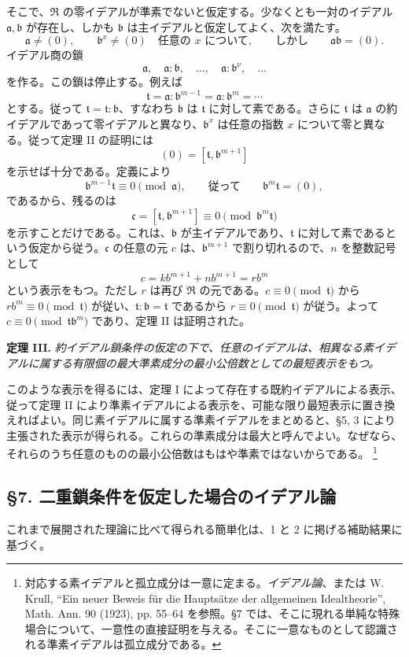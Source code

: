 \documentclass[11pt]{article}
\providecommand{\mR}{\mathfrak{R}}
\providecommand{\ma}{\mathfrak{a}}
\providecommand{\mb}{\mathfrak{b}}
\providecommand{\mc}{\mathfrak{c}}
\providecommand{\mt}{\mathfrak{t}}
\begin{document}
そこで、$\mR$ の零イデアルが準素でないと仮定する。少なくとも一対のイデアル $\ma,\mb$ が存在し、しかも $\mb$ は主イデアルと仮定してよく、次を満たす。
\[
\ma\ne(0),\qquad \mb^x\ne(0)\quad\text{任意の }x\text{ について},
\qquad\text{しかし}\qquad \ma\mb=(0).
\]
イデアル商の鎖
\[
\ma,\quad \ma:\mb,\quad \ldots,\quad \ma:\mb^\nu,\quad\ldots
\]
を作る。この鎖は停止する。例えば
\[
\mt=\ma:\mb^{m-1}=\ma:\mb^m=\cdots
\]
とする。従って $\mt=\mt:\mb$、すなわち $\mb$ は $\mt$ に対して素である。さらに $\mt$ は $\ma$ の約イデアルであって零イデアルと異なり、$\mb^x$ は任意の指数 $x$ について零と異なる。従って定理 II の証明には
\[
        (0)=[\mt,\mb^{m+1}]
\]
を示せば十分である。定義により
\[
        \mb^{m-1}\mt\equiv0\pmod{\ma},\qquad\text{従って}\qquad \mb^m\mt=(0),
\]
であるから、残るのは
\[
        \mc=[\mt,\mb^{m+1}]\equiv0\pmod{\mb^m\mt}
\]
を示すことだけである。これは、$\mb$ が主イデアルであり、$\mt$ に対して素であるという仮定から従う。$\mc$ の任意の元 $c$ は、$\mb^{m+1}$ で割り切れるので、$n$ を整数記号として
\[
        c=k b^{m+1}+n b^{m+1}=r b^m
\]
という表示をもつ。ただし $r$ は再び $\mR$ の元である。$c\equiv0\pmod{\mt}$ から $r b^m\equiv0\pmod{\mt}$ が従い、$\mt:\mb=\mt$ であるから $r\equiv0\pmod{\mt}$ が従う。よって $c\equiv0\pmod{\mt\mb^m}$ であり、定理 II は証明された。

\textbf{定理 III.} \emph{約イデアル鎖条件の仮定の下で、任意のイデアルは、相異なる素イデアルに属する有限個の最大準素成分の最小公倍数としての最短表示をもつ。}

このような表示を得るには、定理 I によって存在する既約イデアルによる表示、従って定理 II により準素イデアルによる表示を、可能な限り最短表示に置き換えればよい。同じ素イデアルに属する準素イデアルをまとめると、§5, 3 により主張された表示が得られる。これらの準素成分は最大と呼んでよい。なぜなら、それらのうち任意のものの最小公倍数はもはや準素ではないからである。
\footnote{対応する素イデアルと孤立成分は一意に定まる。\emph{イデアル論}、または W. Krull, ``Ein neuer Beweis für die Hauptsätze der allgemeinen Idealtheorie'', Math. Ann. 90 (1923), pp. 55--64 を参照。§7 では、そこに現れる単純な特殊場合について、一意性の直接証明を与える。そこに一意なものとして認識される準素イデアルは孤立成分である。}

\subsection*{§7. 二重鎖条件を仮定した場合のイデアル論}

これまで展開された理論に比べて得られる簡単化は、1 と 2 に掲げる補助結果に基づく。
\end{document}
